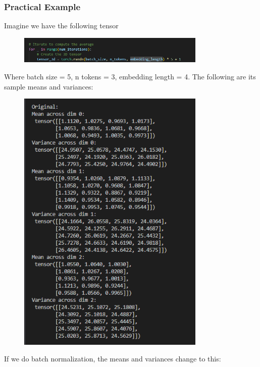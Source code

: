 \documentclass[12pt]{article}
\begin{document}
\subsubsection{Practical Example}
Imagine we have the following tensor
\begin{figure}[H]
    \centering
    \includegraphics[width=0.8\textwidth]{./normalization_demo_tensor.png} %
\end{figure}
Where batch size = 5, n tokens = 3, embedding length = 4. The following are its sample means and variances:
\begin{figure}[H]
    \centering
    \includegraphics[width=0.8\textwidth]{./original_tensor.png} %
\end{figure}
If we do batch normalization, the means and variances change to this: 
\end{document}
